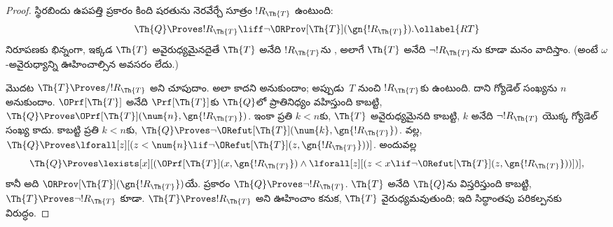 \documentclass[../../../include/open-logic-section]{subfiles}
\begin{document}
\begin{proof}
స్థిరబిందు ఉపపత్తి ప్రకారం కింది షరతును నెరవేర్చే సూత్రం
$!R_\Th{T}$ ఉంటుంది:
\begin{equation}
  \Th{Q} \Proves !R_\Th{T} \liff \lnot \ORProv[\Th{T}](\gn{!R_\Th{T}}).
  \ollabel{RT}
\end{equation}
 నిరూపణకు భిన్నంగా, ఇక్కడ $\Th{T}$
అవైరుధ్యమైనదైతే $\Th{T}$ అనేది $!R_\Th{T}$ను , అలాగే
$\Th{T}$ అనేది $\lnot !R_\Th{T}$ను కూడా  మనం వాదిస్తాం. (అంటే
$\omega$-అవైరుధ్యాన్ని ఊహించాల్సిన అవసరం లేదు.)

మొదట $\Th{T} \Proves/ !R_{\Th{T}}$ అని చూపుదాం. అలా కాదని అనుకుందాం;
అప్పుడు~$T$ నుంచి $!R_{\Th{T}}$కు  ఉంటుంది. దాని గ్యోడెల్
సంఖ్యను $n$ అనుకుందాం. $\OPrf[\Th{T}]$ అనేది $\Prf[\Th{T}]$కు
$\Th{Q}$లో ప్రాతినిధ్యం వహిస్తుంది కాబట్టి,
$\Th{Q} \Proves \OPrf[\Th{T}](\num{n},\gn{!R_{\Th{T}}})$. ఇంకా ప్రతి
$k<n$కు, $\Th{T}$ అవైరుధ్యమైనది కాబట్టి, $k$ అనేది $\lnot !R_{\Th{T}}$
యొక్క  గ్యోడెల్ సంఖ్య కాదు. కాబట్టి ప్రతి $k<n$కు,
$\Th{Q} \Proves \lnot \ORefut[\Th{T}](\num{k},\gn{!R_{\Th{T}}})$.
 వల్ల,
$\Th{Q} \Proves \lforall[z][(z < \num{n} \lif \lnot
\ORefut[\Th{T}](z,\gn{!R_{\Th{T}}}))]$. అందువల్ల
\[
\Th{Q} \Proves \lexists[x][(\OPrf[\Th{T}](x,\gn{!R_{\Th{T}}}) \land \lforall[z][(z
    < x \lif \lnot \ORefut[\Th{T}](z,\gn{!R_{\Th{T}}}))])],
\]
కానీ అది $\ORProv[\Th{T}](\gn{!R_{\Th{T}}})$యే.  ప్రకారం
$\Th{Q} \Proves \lnot !R_{\Th{T}}$. $\Th{T}$ అనేది $\Th{Q}$ను
విస్తరిస్తుంది కాబట్టి, $\Th{T} \Proves \lnot !R_{\Th{T}}$ కూడా.
$\Th{T} \Proves !R_{\Th{T}}$ అని ఊహించాం కనుక, $\Th{T}$ వైరుధ్యమవుతుంది;
ఇది సిద్ధాంతపు పరికల్పనకు విరుద్ధం.


\end{proof}
\end{document}
